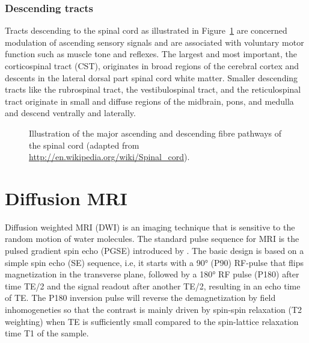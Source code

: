 \subsubsection*{Descending tracts}
\label{sec:chap2:descendingtracts}
Tracts descending to the spinal cord as illustrated in Figure~\ref{fig:spinal_cord_anatomy} are concerned modulation of ascending sensory signals and are associated with voluntary motor function such as muscle tone and reflexes. The largest and most important, the corticospinal tract (CST), originates in broad regions of the cerebral cortex and descents in the lateral dorsal part spinal cord white matter. Smaller descending tracts like the rubrospinal tract, the vestibulospinal tract, and the reticulospinal tract originate in small and diffuse regions of the midbrain, pons, and medulla and descend ventrally and laterally.

\begin{figure}
 \centering
  \caption{Illustration of the major ascending and descending fibre pathways of the spinal cord (adapted from \url{http://en.wikipedia.org/wiki/Spinal_cord}).}
  \label{fig:spinal_cord_anatomy}
\end{figure}


\section{Diffusion MRI}
Diffusion weighted MRI (DWI) is an imaging technique that is sensitive to the random motion of water molecules. The standard pulse sequence for MRI is the pulsed gradient spin echo (PGSE) introduced by \cite{Stejskal:1965}. The basic design is based on a simple spin echo (SE) sequence, i.e, it starts with a 90° (P90) RF-pulse that flips magnetization in the transverse plane, followed by a 180° RF pulse (P180) after time TE/2 and the signal readout after another TE/2, resulting in an echo time of TE. The P180 inversion pulse will reverse the demagnetization by field inhomogeneties so that the contrast is mainly driven by spin-spin relaxation (T2 weighting) when TE is sufficiently small compared to the spin-lattice relaxation time T1 of the sample. 


